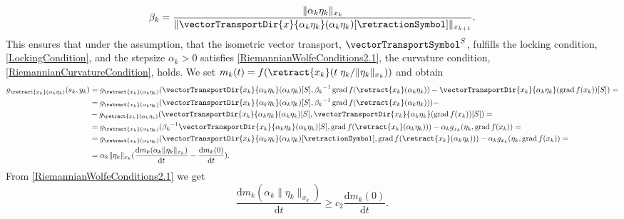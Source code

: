 \begin{equation}\label{LockingConditionParameter}
    \beta_k = \frac{\lVert \alpha_k \eta_k \rVert_{x_k}}{\lVert \vectorTransportDir{x}{\alpha_k \eta_k}(\alpha_k \eta_k)[\retractionSymbol] \rVert_{x_{k+1}}}.
\end{equation}
This ensures that under the assumption, that the isometric vector transport, $\vectorTransportSymbol^S$, fulfills the locking condition, \cref{LockingCondition}, and the stepsize $\alpha_k > 0$ satisfies \cref{RiemannianWolfeConditions2.1}, the curvature condition, \cref{RiemannianCurvatureCondition}, holds. We set $m_k(t) = f(\retract{x_k}(t \; \eta_k / \lVert \eta_k \rVert_{x_k}))$ and obtain
\begin{equation*}
    \begin{split}
        g_{\retract{x_k}(\alpha_k \eta_k)}(s_k,y_k) & = g_{\retract{x_k}(\alpha_k \eta_k)}(\vectorTransportDir{x_k}{\alpha_k \eta_k}(\alpha_k \eta_k)[S], {\beta_k}^{-1} \operatorname{grad} f(\retract{x_k}(\alpha_k \eta_k)) - \vectorTransportDir{x_k}{\alpha_k \eta_k}(\operatorname{grad} f(x_k))[S] ) = \\
        & = g_{\retract{x_k}(\alpha_k \eta_k)}(\vectorTransportDir{x_k}{\alpha_k \eta_k}(\alpha_k \eta_k)[S], {\beta_k}^{-1} \operatorname{grad} f(\retract{x_k}(\alpha_k \eta_k))) - \\
        & -  g_{\retract{x_k}(\alpha_k \eta_k)} ( \vectorTransportDir{x_k}{\alpha_k \eta_k}(\alpha_k \eta_k)[S] , \vectorTransportDir{x_k}{\alpha_k \eta_k}(\operatorname{grad} f(x_k))[S] ) = \\
        & = g_{\retract{x_k}(\alpha_k \eta_k)}({\beta_k}^{-1} \vectorTransportDir{x_k}{\alpha_k \eta_k}(\alpha_k \eta_k)[S], \operatorname{grad} f(\retract{x_k}(\alpha_k \eta_k))) -  \alpha_k g_{x_k} ( \eta_k, \operatorname{grad} f(x_k)) = \\
        & = g_{\retract{x_k}(\alpha_k \eta_k)}(\vectorTransportDir{x_k}{\alpha_k \eta_k}(\alpha_k \eta_k)[\retractionSymbol], \operatorname{grad} f(\retract{x_k}(\alpha_k \eta_k))) -  \alpha_k g_{x_k} ( \eta_k, \operatorname{grad} f(x_k)) = \\
        & = \alpha_k \lVert \eta_k \rVert_{x_k} (\frac{\mathrm{d} m_k(\alpha_k \lVert \eta_k \rVert_{x_k})}{\mathrm{d}t} - \frac{\mathrm{d} m_k(0)}{\mathrm{d}t}).
    \end{split}
\end{equation*}
From \cref{RiemannianWolfeConditions2.1} we get 
\begin{equation*}
    \frac{\mathrm{d} m_k(\alpha_k \lVert \eta_k \rVert_{x_k})}{\mathrm{d}t} \geq c_2 \frac{\mathrm{d} m_k(0)}{\mathrm{d}t}.
\end{equation*}
